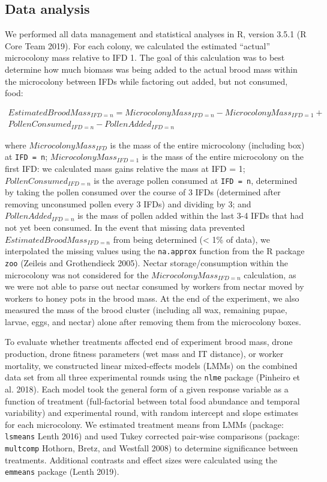 \documentclass[11pt,]{article}
\begin{document}
\hypertarget{data-analysis}{%
\subsection{Data analysis}\label{data-analysis}}

We performed all data management and statistical analyses in R, version
3.5.1 (R Core Team 2019). For each colony, we calculated the estimated
``actual'' microcolony mass relative to IFD 1. The goal of this
calculation was to best determine how much biomass was being added to
the actual brood mass within the microcolony between IFDs while
factoring out added, but not consumed, food:

\[
\begin{aligned}
Estimated Brood Mass_{IFD = n} = Microcolony Mass_{IFD = n} - Microcolony Mass_{IFD = 1} + \\
Pollen Consumed_{IFD = n} - Pollen Added_{IFD = n}
\end{aligned}
\]

where \(Microcolony Mass_{IFD}\) is the mass of the entire microcolony
(including box) at \texttt{IFD\ =\ n}; \(Microcolony Mass_{IFD = 1}\) is
the mass of the entire microcolony on the first IFD: we calculated mass
gains relative the mass at IFD = 1; \(Pollen Consumed_{IFD = n}\) is the
average pollen consumed at \texttt{IFD\ =\ n}, determined by taking the
pollen consumed over the course of 3 IFDs (determined after removing
unconsumed pollen every 3 IFDs) and dividing by 3; and
\(Pollen Added_{IFD = n}\) is the mass of pollen added within the last
3-4 IFDs that had not yet been consumed. In the event that missing data
prevented \(Estimated Brood Mass_{IFD = n}\) from being determined
(\textless{} 1\% of data), we interpolated the missing values using the
\texttt{na.approx} function from the R package \texttt{zoo} (Zeileis and
Grothendieck 2005). Nectar storage/consumption within the microcolony
was not considered for the \(Microcolony Mass_{IFD = n}\) calculation,
as we were not able to parse out nectar consumed by workers from nectar
moved by workers to honey pots in the brood mass. At the end of the
experiment, we also measured the mass of the brood cluster (including
all wax, remaining pupae, larvae, eggs, and nectar) alone after removing
them from the microcolony boxes.

To evaluate whether treatments affected end of experiment brood mass,
drone production, drone fitness parameters (wet mass and IT distance),
or worker mortality, we constructed linear mixed-effects models (LMMs)
on the combined data set from all three experimental rounds using the
\texttt{nlme} package (Pinheiro et al. 2018). Each model took the
general form of a given response variable as a function of treatment
(full-factorial between total food abundance and temporal variability)
and experimental round, with random intercept and slope estimates for
each microcolony. We estimated treatment means from LMMs (package:
\texttt{lsmeans} Lenth 2016) and used Tukey corrected pair-wise
comparisons (package: \texttt{multcomp} Hothorn, Bretz, and Westfall
2008) to determine significance between treatments. Additional contrasts
and effect sizes were calculated using the \texttt{emmeans} package
(Lenth 2019).
\end{document}
